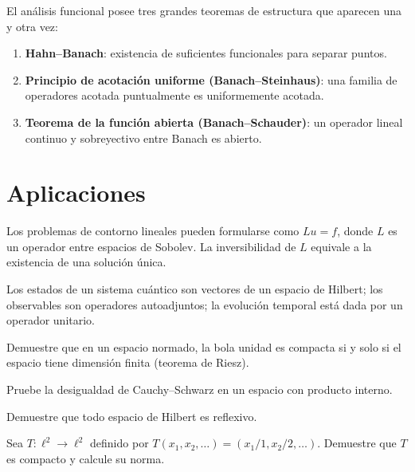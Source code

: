 El análisis funcional posee tres grandes teoremas de estructura que aparecen una y otra vez:
\begin{enumerate}
  \item \textbf{Hahn--Banach}: existencia de suficientes funcionales para separar puntos.
  \item \textbf{Principio de acotación uniforme (Banach--Steinhaus)}: una familia de operadores acotada puntualmente es uniformemente acotada.
  \item \textbf{Teorema de la función abierta (Banach--Schauder)}: un operador lineal continuo y sobreyectivo entre Banach es abierto.
\end{enumerate}

\section{Aplicaciones}

\begin{example}
\label{ej:edos-af}
Los problemas de contorno lineales pueden formularse como $Lu=f$, donde $L$ es un operador entre espacios de Sobolev. La inversibilidad de $L$ equivale a la existencia de una solución única.
\end{example}

\begin{example}
\label{ej:cuantica}
Los estados de un sistema cuántico son vectores de un espacio de Hilbert; los observables son operadores autoadjuntos; la evolución temporal está dada por un operador unitario.
\end{example}

\begin{exercise}
Demuestre que en un espacio normado, la bola unidad es compacta si y solo si el espacio tiene dimensión finita (teorema de Riesz).
\end{exercise}

\begin{exercise}
Pruebe la desigualdad de Cauchy--Schwarz en un espacio con producto interno.
\end{exercise}

\begin{exercise}
Demuestre que todo espacio de Hilbert es reflexivo.
\end{exercise}

\begin{problem}
Sea $T\colon\ell^2\to\ell^2$ definido por $T(x_1,x_2,\dots)=(x_1/1,x_2/2,\dots)$. Demuestre que $T$ es compacto y calcule su norma.
\end{problem}
